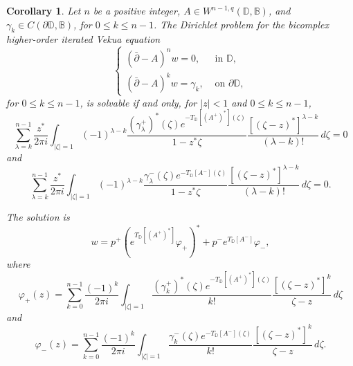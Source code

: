 \documentclass[12pt,reqno]{amsart}
\newtheorem{corr}[theorem]{Corollary}
\theoremstyle{definition}
\theoremstyle{remark}
\newcommand{\p}{\partial}
\newcommand{\dbar}{\bar\partial}
\newcommand{\bc}{\mathbb{B}}
\newcommand{\disk}{\mathbb{D}}
\begin{document}
            \begin{corr}
                Let $n$ be a positive integer, $A \in W^{n-1,q}(\disk,\bc)$, and $\gamma_k \in C(\p\disk,\bc)$, for $0 \leq k \leq n-1$. The Dirichlet problem for the bicomplex higher-order iterated Vekua equation
                \[
                    \begin{cases}
                        (\dbar-A)^n w = 0, & \text{ in } \disk,\\
                        (\dbar - A)^k w = \gamma_k, & \text{ on } \p\disk,
                    \end{cases}
                \]
                for $0 \leq k \leq n-1$, is solvable if and only, for $|z| < 1$  and $0 \leq k \leq n-1$,
                \[
                    \sum_{\lambda = k}^{n-1}\frac{z^*}{2\pi i} \int_{|\zeta| = 1} (-1)^{\lambda - k} \frac{(\gamma_\lambda^+)^*(\zeta)e^{-T_\disk[(A^+)^*](\zeta)}}{1- z^*\zeta} \frac{[(\zeta - z)^*]^{\lambda- k}}{(\lambda - k)!}\,d\zeta   = 0
                \]
                and
                \[
                    \sum_{\lambda = k}^{n-1}\frac{z^*}{2\pi i} \int_{|\zeta| = 1} (-1)^{\lambda - k} \frac{\gamma_\lambda^-(\zeta) e^{-T_\disk[A^-](\zeta)}}{1- z^*\zeta} \frac{[(\zeta - z)^*]^{\lambda- k}}{(\lambda - k)!}\,d\zeta   = 0.
                \]


                The solution is 
                \[
                    w = p^+ (e^{T_\disk[(A^+)^*]}  \varphi_+)^* + p^- e^{T_\disk[A^-]} \varphi_-, 
                \]
                where
                \[
                     \varphi_+(z) =  \sum_{k=0}^{n-1} \frac{(-1)^k}{2\pi i} \int_{|\zeta| = 1} \frac{(\gamma_k^+)^*(\zeta)e^{-T_\disk[(A^+)^*](\zeta)}}{k!} \frac{[(\zeta - z)^*]^k}{\zeta - z}\,d\zeta 
                \]
                and
                \[
                     \varphi_-(z) =  \sum_{k=0}^{n-1} \frac{(-1)^k}{2\pi i} \int_{|\zeta| = 1} \frac{\gamma_k^-(\zeta)e^{-T_\disk[A^-](\zeta)}}{k!} \frac{[(\zeta - z)^*]^k}{\zeta - z}\,d\zeta .
                \]
            \end{corr}
\end{document}
